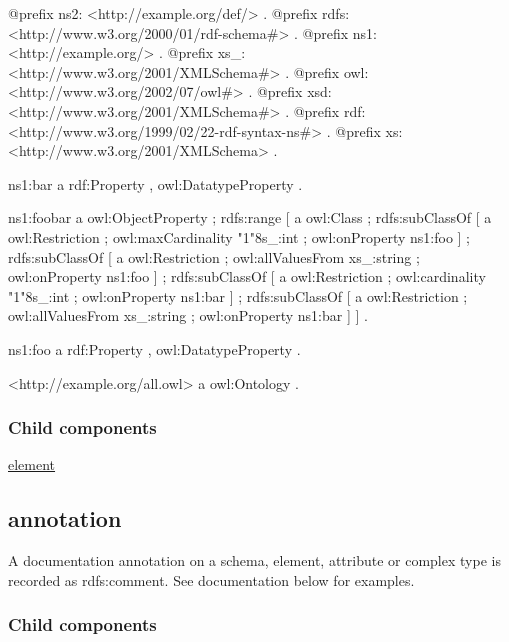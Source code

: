 \begin{DoxyCodeInclude}
@prefix ns2:     <http://example.org/def/> .
@prefix rdfs:    <http://www.w3.org/2000/01/rdf-schema#> .
@prefix ns1:     <http://example.org/> .
@prefix xs_:     <http://www.w3.org/2001/XMLSchema#> .
@prefix owl:     <http://www.w3.org/2002/07/owl#> .
@prefix xsd:     <http://www.w3.org/2001/XMLSchema#> .
@prefix rdf:     <http://www.w3.org/1999/02/22-rdf-syntax-ns#> .
@prefix xs:      <http://www.w3.org/2001/XMLSchema> .

ns1:bar
      a       rdf:Property , owl:DatatypeProperty .

ns1:foobar
      a       owl:ObjectProperty ;
      rdfs:range
              [ a       owl:Class ;
                rdfs:subClassOf
                        [ a       owl:Restriction ;
                          owl:maxCardinality "1"^^xs_:int ;
                          owl:onProperty ns1:foo
                        ] ;
                rdfs:subClassOf
                        [ a       owl:Restriction ;
                          owl:allValuesFrom xs_:string ;
                          owl:onProperty ns1:foo
                        ] ;
                rdfs:subClassOf
                        [ a       owl:Restriction ;
                          owl:cardinality "1"^^xs_:int ;
                          owl:onProperty ns1:bar
                        ] ;
                rdfs:subClassOf
                        [ a       owl:Restriction ;
                          owl:allValuesFrom xs_:string ;
                          owl:onProperty ns1:bar
                        ]
              ] .

ns1:foo
      a       rdf:Property , owl:DatatypeProperty .

<http://example.org/all.owl>
      a       owl:Ontology .
\end{DoxyCodeInclude}
\hypertarget{list_annotationChildren}{}\subsubsection{Child components}\label{list_annotationChildren}

\begin{DoxyItemize}
\item \hyperlink{element}{element} 
\end{DoxyItemize}\hypertarget{annotation}{}\subsection{annotation}\label{annotation}
A documentation annotation on a schema, element, attribute or complex type is recorded as rdfs:comment. See documentation below for examples.\hypertarget{list_annotationChildren}{}\subsubsection{Child components}\label{list_annotationChildren}

